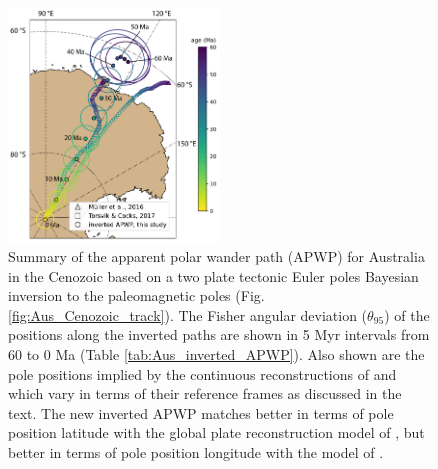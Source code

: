 \documentclass[]{agujournal2019}
\begin{document}
\begin{figure}
\centering
\includegraphics[width=0.5\textwidth]{fig_aus_predicted_APWP.pdf}
\caption{Summary of the apparent polar wander path (APWP) for Australia in the Cenozoic based on a two plate tectonic Euler poles Bayesian inversion to the paleomagnetic poles (Fig. \ref{fig:Aus_Cenozoic_track}). The Fisher angular deviation ($\theta_{95}$) of the positions along the inverted paths are shown in 5 Myr intervals from 60 to 0 Ma (Table \ref{tab:Aus_inverted_APWP}). Also shown are the pole positions implied by the continuous reconstructions of  and  which vary in terms of their reference frames as discussed in the text. The new inverted APWP matches better in terms of pole position latitude with the global plate reconstruction model of , but better in terms of pole position longitude with the model of .}
\label{fig:Aus_inverted_APWP}
\end{figure}
\end{document}
